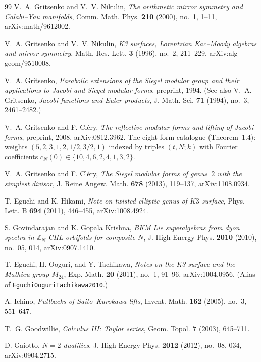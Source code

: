 \begin{thebibliography}{99}
V.~A. Gritsenko and V.~V. Nikulin, \emph{The arithmetic mirror symmetry and Calabi--Yau manifolds}, Comm. Math. Phys. \textbf{210} (2000), no.~1, 1--11, arXiv:math/9612002.

V.~A. Gritsenko and V.~V. Nikulin, \emph{K3 surfaces, Lorentzian Kac--Moody algebras and mirror symmetry}, Math. Res. Lett. \textbf{3} (1996), no.~2, 211--229, arXiv:alg-geom/9510008.

V.~A. Gritsenko, \emph{Parabolic extensions of the Siegel modular group and their applications to Jacobi and Siegel modular forms}, preprint, 1994. (See also V.~A. Gritsenko, \emph{Jacobi functions and Euler products}, J. Math. Sci. \textbf{71} (1994), no.~3, 2461--2482.)

V.~A. Gritsenko and F. Cl\'ery, \emph{The reflective modular forms and lifting of Jacobi forms}, preprint, 2008, arXiv:0812.3962. The eight-form catalogue (Theorem~$1.4$): weights $(5, 2, 3, 1, 2, 1/2, 3/2, 1)$ indexed by triples $(t, N; k)$ with Fourier coefficients $c_N(0) \in \{10, 4, 6, 2, 4, 1, 3, 2\}$.

V.~A. Gritsenko and F. Cl\'ery, \emph{The Siegel modular forms of genus~$2$ with the simplest divisor}, J. Reine Angew. Math. \textbf{678} (2013), 119--137, arXiv:1108.0934.

T. Eguchi and K. Hikami, \emph{Note on twisted elliptic genus of $K3$ surface}, Phys. Lett. B \textbf{694} (2011), 446--455, arXiv:1008.4924.

S. Govindarajan and K. Gopala Krishna, \emph{BKM Lie superalgebras from dyon spectra in $\mathbb{Z}_N$ CHL orbifolds for composite $N$}, J. High Energy Phys. \textbf{2010} (2010), no.~05, 014, arXiv:0907.1410.

T. Eguchi, H. Ooguri, and Y. Tachikawa, \emph{Notes on the K3 surface and the Mathieu group $M_{24}$}, Exp. Math. \textbf{20} (2011), no.~1, 91--96, arXiv:1004.0956. (Alias of \texttt{EguchiOoguriTachikawa2010}.)

A. Ichino, \emph{Pullbacks of Saito--Kurokawa lifts}, Invent. Math. \textbf{162} (2005), no.~3, 551--647.

T.~G. Goodwillie, \emph{Calculus III: Taylor series}, Geom. Topol. \textbf{7} (2003), 645--711.

D. Gaiotto, \emph{$N=2$ dualities}, J. High Energy Phys. \textbf{2012} (2012), no.~08, 034, arXiv:0904.2715.


\end{thebibliography}
